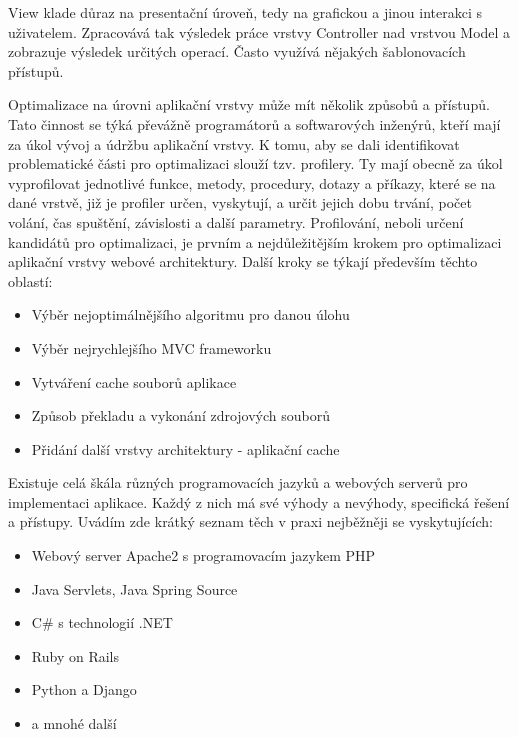 \documentclass[12pt]{article}
\begin{document}
View klade důraz na presentační úroveň, tedy na grafickou a jinou interakci s uživatelem. Zpracovává tak výsledek práce vrstvy Controller nad vrstvou Model a zobrazuje výsledek určitých operací. Často využívá nějakých šablonovacích přístupů. \cite{design-patterns}

\obrazek
{}

\label{sec:profiler}

Optimalizace na úrovni aplikační vrstvy může mít několik způsobů a přístupů. Tato činnost se týká převážně programátorů a softwarových inženýrů, kteří mají za úkol vývoj a údržbu aplikační vrstvy. K tomu, aby se dali identifikovat problematické části pro optimalizaci slouží tzv. profilery. Ty mají obecně za úkol vyprofilovat jednotlivé funkce, metody, procedury, dotazy a příkazy, které se na dané vrstvě, již je profiler určen, vyskytují, a určit jejich dobu trvání, počet volání, čas spuštění, závislosti a další parametry. Profilování, neboli určení kandidátů pro optimalizaci, je prvním a nejdůležitějším krokem pro optimalizaci aplikační vrstvy webové architektury. Další kroky se týkají především těchto oblastí:

\begin{itemize}
\item Výběr nejoptimálnějšího algoritmu pro danou úlohu
\item Výběr nejrychlejšího MVC frameworku
\item Vytváření cache souborů aplikace
\item Způsob překladu a vykonání zdrojových souborů
\item Přidání další vrstvy architektury - aplikační cache
\end{itemize}

Existuje celá škála různých programovacích jazyků a webových serverů pro implementaci aplikace. Každý z nich má své výhody a nevýhody, specifická řešení a přístupy. Uvádím zde krátký seznam těch v praxi nejběžněji se vyskytujících:

\begin{itemize}
\item Webový server Apache2 s programovacím jazykem PHP
\item Java Servlets, Java Spring Source
\item C\# s technologií .NET
\item Ruby on Rails
\item Python a Django
\item a mnohé další
\end{itemize}
\end{document}

